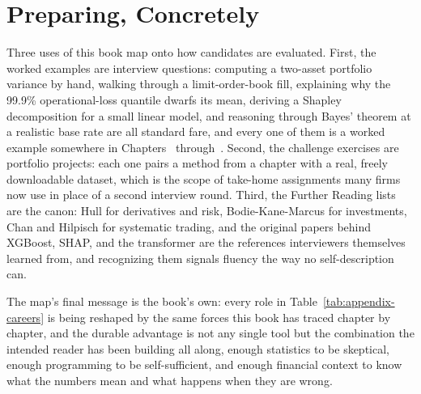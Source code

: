 \documentclass[../ai_in_finance]{subfiles}
\begin{document}
\section{Preparing, Concretely}

Three uses of this book map onto how candidates are evaluated. First, the worked examples are interview questions: computing a two-asset portfolio variance by hand, walking through a limit-order-book fill, explaining why the 99.9\% operational-loss quantile dwarfs its mean, deriving a Shapley decomposition for a small linear model, and reasoning through Bayes' theorem at a realistic base rate are all standard fare, and every one of them is a worked example somewhere in Chapters~ through~. Second, the challenge exercises are portfolio projects: each one pairs a method from a chapter with a real, freely downloadable dataset, which is the scope of take-home assignments many firms now use in place of a second interview round. Third, the Further Reading lists are the canon: Hull for derivatives and risk, Bodie-Kane-Marcus for investments, Chan and Hilpisch for systematic trading, and the original papers behind XGBoost, SHAP, and the transformer are the references interviewers themselves learned from, and recognizing them signals fluency the way no self-description can.

The map's final message is the book's own: every role in Table~\ref{tab:appendix-careers} is being reshaped by the same forces this book has traced chapter by chapter, and the durable advantage is not any single tool but the combination the intended reader has been building all along, enough statistics to be skeptical, enough programming to be self-sufficient, and enough financial context to know what the numbers mean and what happens when they are wrong.
\end{document}
